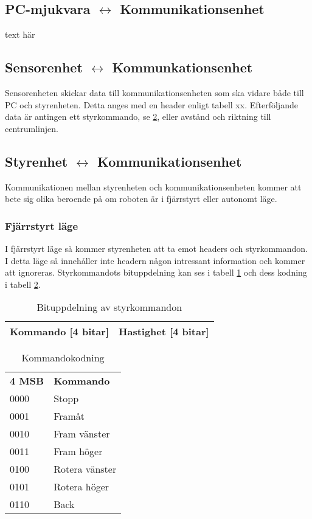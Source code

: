 \subsection{PC-mjukvara $\longleftrightarrow$ Kommunikationsenhet}
text här

\subsection{Sensorenhet $\longleftrightarrow$ Kommunkationsenhet}
Sensorenheten skickar data till kommunikationsenheten som ska vidare både till PC och styrenheten. Detta anges med en header enligt tabell xx. Efterföljande data är antingen ett styrkommando, se \ref{tab:styrkommando}, eller avstånd och riktning till centrumlinjen.

\subsection{Styrenhet $\longleftrightarrow$ Kommunikationsenhet}
Kommunikationen mellan styrenheten och kommunikationsenheten kommer att bete sig olika beroende på
om roboten är i fjärrstyrt eller autonomt läge.
\subsubsection{Fjärrstyrt läge}
I fjärrstyrt läge så kommer styrenheten att ta emot headers och styrkommandon. I detta läge så 
innehåller inte headern någon intressant information och kommer att ignoreras. Styrkommandots bituppdelning kan ses i 
tabell \ref{tab:styrbitar} och dess kodning i tabell \ref{tab:styrkommando}.
 
\begin{table}[h] 
  \centering
  \begin{tabular}{| c | c |}
    \hline
    Kommando [4 bitar] & Hastighet [4 bitar] \\ \hline
  \end{tabular}
  \caption{Bituppdelning av styrkommandon}
  \label{tab:styrbitar}
\end{table}

\begin{table}[h] 
  \centering
  \begin{tabular}{l l}
    \textbf{4 MSB} & \textbf{Kommando} \\
    0000 & Stopp \\
    0001 & Framåt \\
    0010 & Fram vänster \\
    0011 & Fram höger \\
    0100 & Rotera vänster \\
    0101 & Rotera höger \\
    0110 & Back \\
  \end{tabular}
  \caption{Kommandokodning}
  \label{tab:styrkommando}
\end{table}

